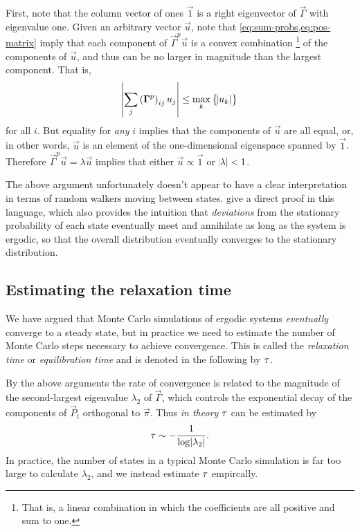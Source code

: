 First, note that the column vector of ones $\vec{1}$ is a right eigenvector of
$\vec{\Gamma}$ with eigenvalue one. Given an arbitrary vector $\vec{u}$, note
that \cref{eq:sum-probs,eq:pos-matrix} imply that each component of
$\vec{\Gamma}^p \vec{u}$ is a convex combination%
\footnote{%
  That is, a linear combination in which the coefficients are all positive and
  sum to one.
}
of the components of $\vec{u}$, and thus can be no larger in magnitude than the
largest component. That is,
\begin{equation}
  \abs{\sum_j \del{\vec{\Gamma}^p}_{ij} u_j}
  \leq \max_k \cbr{\abs{u_k}}
\end{equation}
for all $i$. But equality for \emph{any} $i$ implies that the components of
$\vec{u}$ are all equal, or, in other words, $\vec{u}$ is an element of the
one-dimensional eigenspace spanned by $\vec{1}$. Therefore
$\vec{\Gamma}^p \vec{u} = \lambda\vec{u}$ implies that either $\vec{u} \propto \vec{1}$
or $\abs{\lambda}<1$.

The above argument unfortunately doesn't appear to have a clear interpretation
in terms of random walkers moving between states.
\textcite{narayan2001convergence} give a direct proof in this language, which
also provides the intuition that \emph{deviations} from the stationary
probability of each state eventually meet and annihilate as long as the system
is ergodic, so that the overall distribution eventually converges to the
stationary distribution.

\subsection{Estimating the relaxation time}
\label{sec:numerical-equilibration}

We have argued that Monte Carlo simulations of ergodic systems
\emph{eventually} converge to a steady state, but in practice we need to
estimate the number of Monte Carlo steps necessary to achieve convergence. This
is called the \emph{relaxation time} or \emph{equilibration time} and is
denoted in the following by $\tau$.

By the above arguments the rate of convergence is related to the magnitude of
the second-largest eigenvalue $\lambda_2$ of $\vec{\Gamma}$, which controls the
exponential decay of the components of $\vec{P}_t$ orthogonal to $\vec{\pi}$.
Thus \emph{in theory} $\tau$ can be estimated by
\begin{equation}
  \tau \sim -\frac{1}{\log{\abs{\lambda_2}}}.
\end{equation}
In practice, the number of states in a typical Monte Carlo simulation is far
too large to calculate $\lambda_2$, and we instead estimate $\tau$ empircally.

